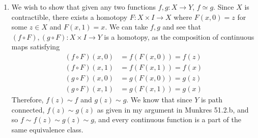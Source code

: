\begin{solution}
\begin{enumerate}
      \item We wish to show that given any two functions $f, g: X \rightarrow Y$, $f \simeq g$. Since $X$ is contractible, there exists a homotopy $F: X \times I \rightarrow X$ where $F(x, 0) = z$ for some $z \in X$ and $F(x, 1) = x$. We can take $f, g$ and see that $(f \circ F), (g \circ F): X \times I \rightarrow Y$ is a homotopy, as the composition of continuous maps satisfying 
      \begin{align}
        (f \circ F)(x, 0) & = f(F(x, 0)) = f(z) \\ 
        (f \circ F)(x, 1) & = f(F(x, 1)) = f(x) \\ 
        (g \circ F)(x, 0) & = g(F(x, 0)) = g(z) \\ 
        (g \circ F)(x, 1) & = g(F(x, 1)) = g(x) 
      \end{align}
      Therefore, $f(z) \sim f$ and $g(z) \sim g$. We know that since $Y$ is path connected, $f(z) \sim g(z)$ as given in my argument in Munkres 51.2.b, and so $f \sim f(z) \sim g(z) \sim g$, and every continuous function is a part of the same equivalence class. 
    \end{enumerate}
  \end{solution}

